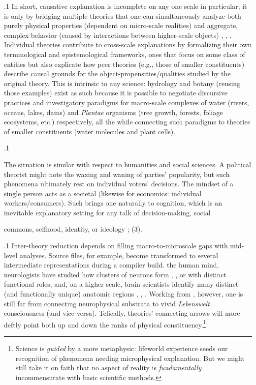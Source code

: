 \documentclass[11pt, twocolumn]{article}
\begin{document}
\p.1{%
\:\+In short, causative explanation is incomplete on any one scale in
particular; it is only by bridging multiple theories that one can
simultaneously analyze both purely physical properties (dependent
on micro-scale realities) and aggregate, complex behavior
(caused by interactions between higher-scale objects)
, , . \>  Individual
theories contribute to cross-scale explanations by formalizing
their own terminological and epistemological frameworks, ones
that focus on some class of entities but also explicate how
peer theories (e.g., those of smaller constituents) describe
causal grounds for the object-propensities/qualities studied by
the original theory. \>  This is intrinsic to any science: hydrology
and botany (reusing those examples) exist as such because it
is possible to negotiate discursive practices and investigatory paradigms
for macro-scale complexes of water (rivers, oceans, lakes, dams)
and \textit{Plantae} organisms (tree growth, forests, foliage ecosystems, etc.) respectively, all the
while connecting such paradigms to theories of smaller constituents
(water molecules and plant cells).\<\;
}%

\p.1{%
\:\+The situation is similar with respect to humanities and social sciences. \> 
A political theorist might note the waxing and waning of parties' popularity,
but such phenomena ultimately rest on individual voters' decisions. \> 
The mindset of a single person acts as a societal 
(likewise for economics: individual workers/consumers). \>  Such brings
one naturally to cognition, which is an inevitable explanatory
setting for any talk of decision-making, social \begin{makeboxenv}commons, selfhood, identity, or ideology
; (3).\end{makeboxenv}\<\;
}%

\p.1{%
\:\+Inter-theory reduction depends on filling macro-to-microscale gaps with mid-level
analyses. \>  Source files, for example,
become transformed to several intermediate representations during a compiler build. \>  \Visavis{} the
human mind, neurologists have studied how clusters of neurons
form , , or  with distinct functional roles; and,
on a higher scale, brain scientists identify many distinct
(and functionally unique) anatomic regions ,
, . \>  Working from
, however, one is still far from connecting
neurophysical substrata to vivid \textit{Lebenswelt}
consciousness (and vice-versa). \>  Telically,
theories' connecting arrows will more deftly point both up and
down the ranks of physical constituency.\footnote{Science is \textit{guided} by a more
 metaphysic: \label{fn:scienceGuided}lifeworld
experience seeds our
recognition of phenomena needing microphysical explanation. \>  But we might still take it on faith that
no aspect of reality is \textit{fundamentally} incommensurate
with basic scientific methods.}\condenlargepage{2em}\;
}%
\end{document}
